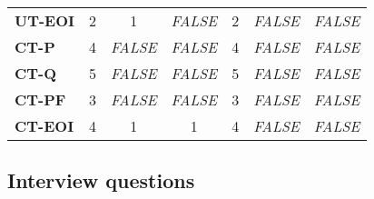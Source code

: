 \documentclass[final_report_innit.tex]{subfiles}
\begin{document}
\begin{table}
\begin{tabular}[b]{l | c | c | c | c | c | c}
	\textbf{UT-EOI} & 2 & 1 & \textit{FALSE} & 2 & \textit{FALSE} & \textit{FALSE} \\ %
	\textbf{CT-P} & 4 & \textit{FALSE} & \textit{FALSE} & 4 & \textit{FALSE} & \textit{FALSE} \\ %
	\textbf{CT-Q} & 5 & \textit{FALSE} & \textit{FALSE} & 5 & \textit{FALSE} & \textit{FALSE} \\ %
	\textbf{CT-PF} & 3 & \textit{FALSE} & \textit{FALSE} & 3 & \textit{FALSE} & \textit{FALSE} \\ %
	\textbf{CT-EOI} & 4 & 1 & 1 & 4 & \textit{FALSE} & \textit{FALSE} \\ %
\end{tabular}
\end{table}

\vfill
\clearpage
\subsection{Interview questions}
\end{document}
